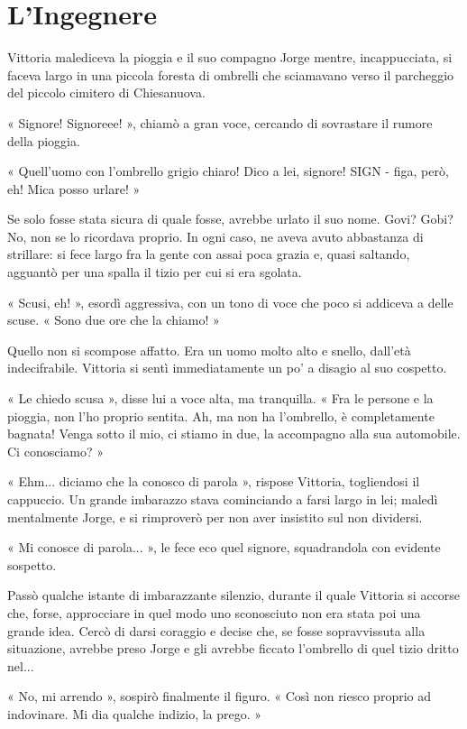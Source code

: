 \chapter{L'Ingegnere}


Vittoria malediceva la pioggia e il suo compagno Jorge mentre, incappucciata, si faceva largo in una piccola foresta di ombrelli che sciamavano verso il parcheggio del piccolo cimitero di Chiesanuova.

« Signore! Signoreee! », chiamò a gran voce, cercando di sovrastare il rumore della pioggia.

« Quell'uomo con l'ombrello grigio chiaro! Dico a lei, signore! SIGN - figa, però, eh! Mica posso urlare! »

Se solo fosse stata sicura di quale fosse, avrebbe urlato il suo nome. Govi? Gobi? No, non se lo ricordava proprio. In ogni caso, ne aveva avuto abbastanza di strillare: si fece largo fra la gente con assai poca grazia e, quasi saltando, agguantò per una spalla il tizio per cui si era sgolata.

« Scusi, eh! », esordì aggressiva, con un tono di voce che poco si addiceva a delle scuse. « Sono due ore che la chiamo! »

Quello non si scompose affatto. Era un uomo molto alto e snello, dall'età indecifrabile. Vittoria si sentì immediatamente un po' a disagio al suo cospetto.

« Le chiedo scusa », disse lui a voce alta, ma tranquilla. « Fra le persone e la pioggia, non l'ho proprio sentita. Ah, ma non ha l'ombrello, è completamente bagnata! Venga sotto il mio, ci stiamo in due, la accompagno alla sua automobile. Ci conosciamo? »

« Ehm... diciamo che la conosco di parola », rispose Vittoria, togliendosi il cappuccio. Un grande imbarazzo stava cominciando a farsi largo in lei; maledì mentalmente Jorge, e si rimproverò per non aver insistito sul non dividersi.

« Mi conosce di parola... », le fece eco quel signore, squadrandola con evidente sospetto.

Passò qualche istante di imbarazzante silenzio, durante il quale Vittoria si accorse che, forse, approcciare in quel modo uno sconosciuto non era stata poi una grande idea. Cercò di darsi coraggio e decise che, se fosse sopravvissuta alla situazione, avrebbe preso Jorge e gli avrebbe ficcato l'ombrello di quel tizio dritto nel...

« No, mi arrendo », sospirò finalmente il figuro. « Così non riesco proprio ad indovinare. Mi dia qualche indizio, la prego. »

